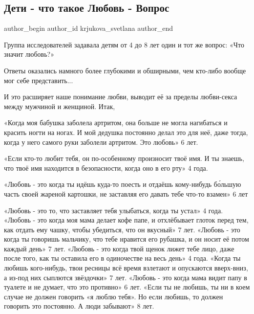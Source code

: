  
 
 
 
 
 
\subsection{Дети - что такое Любовь - Вопрос}
\label{sec:10_06_2021.fb.krjukova_svetlana.1.vopros_ljubov_deti}
\ifcmt
 author_begin
   author_id krjukova_svetlana
 author_end
\fi

Группа исследователей задавала детям от 4 до 8 лет один и тот же вопрос: «Что значит любовь?»

Ответы оказались намного более глубокими и обширными, чем кто-либо вообще мог себе представить...

И это расширяет наше понимание любви, выводит её за пределы любви-секса между мужчиной и женщиной.
Итак,

«Когда моя бабушка заболела артритом, она больше не могла нагибаться и красить
ногти на ногах. И мой дедушка постоянно делал это для неё, даже тогда, когда у
него самого руки заболели артритом. Это любовь» 6 лет.

«Если кто-то любит тебя, он по-особенному произносит твоё имя. И ты знаешь, что
твоё имя находится в безопасности, когда оно в его рту» 4 года.

«Любовь - это когда ты идёшь куда-то поесть и отдаёшь кому-нибудь бо́льшую часть
своей жареной картошки, не заставляя его давать тебе что-то взамен» 6 лет

«Любовь - это то, что заставляет тебя улыбаться, когда ты устал» 4 года.
«Любовь - это когда моя мама делает кофе папе, и отхлёбывает глоток перед тем, как отдать ему чашку, чтобы убедиться, что он вкусный» 7 лет.
«Любовь - это когда ты говоришь мальчику, что тебе нравится его рубашка, и он носит её потом каждый день» 7 лет.
«Любовь - это когда твой щенок лижет тебе лицо, даже после того, как ты оставила его в одиночестве на весь день» 4 года.
«Когда ты любишь кого-нибудь, твои ресницы всё время взлетают и опускаются вверх-вниз, а из-под них сыплются звёздочки» 7 лет.
«Любовь - это когда мама видит папу в туалете и не думает, что это противно» 6 лет.
«Если ты не любишь, ты ни в коем случае не должен говорить «я люблю тебя». Но если любишь, то должен говорить это постоянно. А люди забывают» 8 лет.

